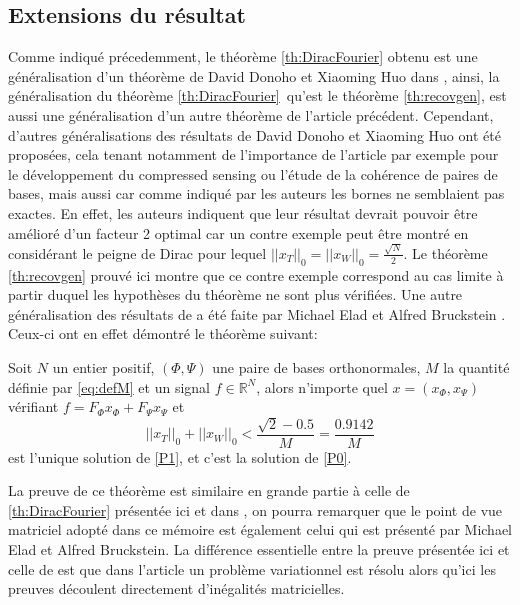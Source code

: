 \subsection{Extensions du résultat}
Comme indiqué précedemment, le théorème \ref{th:DiracFourier} obtenu est une généralisation d'un théorème de David Donoho et Xiaoming Huo dans \cite{DonohoHuo}, ainsi, la généralisation du théorème \ref{th:DiracFourier} qu'est le théorème \ref{th:recovgen}, est aussi une généralisation d'un autre théorème de l'article précédent.
\newline
Cependant, d'autres généralisations des résultats de David Donoho et Xiaoming Huo ont été proposées, cela tenant notamment de l'importance de l'article par exemple pour le développement du compressed sensing ou l'étude de la cohérence de paires de bases, mais aussi car comme indiqué par les auteurs les bornes ne semblaient pas exactes.
\newline
En effet, les auteurs indiquent que leur résultat devrait pouvoir être amélioré d'un facteur 2 optimal car un contre exemple peut être montré en considérant le peigne de Dirac pour lequel $||x_T||_0 = ||x_W||_0 = \frac{\sqrt{N}}{2}$.
Le théorème \ref{th:recovgen} prouvé ici montre que ce contre exemple correspond au cas limite à partir duquel les hypothèses du théorème ne sont plus vérifiées.
\newline
Une autre généralisation des résultats de \cite{DonohoHuo} a été faite par Michael Elad et Alfred Bruckstein \cite{eladBruckstein}. Ceux-ci ont en effet démontré le théorème suivant:
\begin{theoreme}\label{th:eladbruc}
	Soit $N$ un entier positif, $(\Phi, \Psi)$ une paire de bases orthonormales, $M$ la quantité définie par \ref{eq:defM} et un signal $f\in \mathbb{R}^N$, alors n'importe quel $x = (x_\Phi, x_\Psi)$ vérifiant $f = F_\Phi x_\Phi + F_\Psi x_\Psi$ et
	\begin{equation}
		||x_T||_0 + ||x_W||_0 < \frac{\sqrt{2} -0.5}{M} = \frac{0.9142}{M}
	\end{equation}
	est l'unique solution de \ref{P1}, et c'est la solution de \ref{P0}.
\end{theoreme}
La preuve de ce théorème est similaire en grande partie à celle de \ref{th:DiracFourier} présentée ici et dans \cite{DonohoHuo}, on pourra remarquer que le point de vue matriciel adopté dans ce mémoire est également celui qui est présenté par Michael Elad et Alfred Bruckstein.
La différence essentielle entre la preuve présentée ici et celle de \cite{eladBruckstein} est que dans l'article un problème variationnel est résolu alors qu'ici les preuves découlent directement d'inégalités matricielles. 
